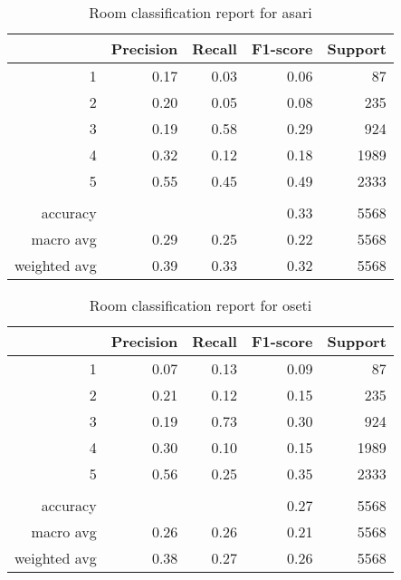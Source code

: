 \documentclass[12pt]{article}
\begin{document}
	\begin{table}
		\begin{center}
			{\renewcommand{\arraystretch}{1.5}
				\renewcommand{\tabcolsep}{0.2cm}
				\begin{tabular}{r r r r r}
					& Precision & Recall & F1-score & Support\\
					\hline
					1 & 0.17 & 0.03 & 0.06 & 87\\
					2 & 0.20 & 0.05 & 0.08 & 235\\
					3 & 0.19 & 0.58 & 0.29 & 924\\
					4 & 0.32 & 0.12 & 0.18 & 1989\\
					5 & 0.55 & 0.45 & 0.49 & 2333\\
					& & & & \\
					accuracy & & & 0.33 & 5568\\
					macro avg & 0.29 & 0.25 & 0.22 & 5568\\
					weighted avg & 0.39 & 0.33 & 0.32 & 5568
			\end{tabular}}
		\end{center}
		\caption{Room classification report for asari}
	\end{table}
	
	\begin{table}
		\begin{center}
			{\renewcommand{\arraystretch}{1.5}
				\renewcommand{\tabcolsep}{0.2cm}
				\begin{tabular}{r r r r r}
					& Precision & Recall & F1-score & Support\\
					\hline
					1 & 0.07 & 0.13 & 0.09 & 87\\
					2 & 0.21 & 0.12 & 0.15 & 235\\
					3 & 0.19 & 0.73 & 0.30 & 924\\
					4 & 0.30 & 0.10 & 0.15 & 1989\\
					5 & 0.56 & 0.25 & 0.35 & 2333\\
					& & & & \\
					accuracy & & & 0.27 & 5568\\
					macro avg & 0.26 & 0.26 & 0.21 & 5568\\
					weighted avg & 0.38 & 0.27 & 0.26 & 5568
			\end{tabular}}
		\end{center}
		\caption{Room classification report for oseti}
	\end{table}
	
\end{document}
